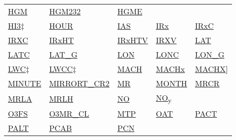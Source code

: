 \documentclass[
  english,
]{book}
\begin{document}
\begin{longtable}[]{@{}lllll@{}}
\href{./the-state-of-the-aircraft.html\#hgm}{HGM} &
\href{./the-state-of-the-aircraft.html\#hgm-232}{HGM232} &
\href{./the-state-of-the-aircraft.html\#hgme-159}{HGME} \\
\href{./the-state-of-the-aircraft.html\#hi3}{HI3\(\ddagger\)} &
\href{./general-information-about-data-files.html\#hms}{HOUR} &
\href{./obsolete-variables.html\#ias}{IAS} &
\href{./obsolete-variables.html\#irx}{IRx} &
\href{./radiation-variables.html\#irxc}{IRxC} \\
\href{./radiation-variables.html\#irxc}{IRXC} &
\href{./radiation-variables.html\#irxht}{IRxHT} &
\href{./radiation-variables.html\#irxht}{IRxHTV} &
\href{./radiation-variables.html\#irxv}{IRXV} &
\href{./the-state-of-the-aircraft.html\#latitude}{LAT} \\
\href{./the-state-of-the-aircraft.html\#latc-lonc}{LATC} &
\href{./the-state-of-the-aircraft.html\#gglat}{LAT\_G} &
\href{./the-state-of-the-aircraft.html\#longitude}{LON} &
\href{./the-state-of-the-aircraft.html\#latc-lonc}{LONC} &
\href{./the-state-of-the-aircraft.html\#gglon}{LON\_G} \\
\href{./obsolete-variables.html\#jwlwc}{LWC\(\ddagger\)} &
\href{./obsolete-variables.html\#jwlw-corrected}{LWCC\(\ddagger\)} &
\href{./the-state-of-the-atmosphere.html\#mach-number}{MACH} &
\href{./the-state-of-the-atmosphere.html\#mach-number}{MACHx} &
\href{./the-state-of-the-atmosphere.html\#mach-number}{MACHX}{]} \\
\href{./general-information-about-data-files.html\#hms}{MINUTE} &
\href{./the-state-of-the-atmosphere.html\#mirror-cr2}{MIRRORT\_CR2} &
\href{./the-state-of-the-atmosphere.html\#MR}{MR} &
\href{./general-information-about-data-files.html\#mdy}{MONTH} &
\href{./the-state-of-the-atmosphere.html\#MR}{MRCR} \\
\href{./the-state-of-the-atmosphere.html\#MR}{MRLA} &
\href{./the-state-of-the-atmosphere.html\#MR}{MRLH} &
\href{./air-chemistry-measurements.html\#no-noy}{NO} &
\href{./air-chemistry-measurements.html\#no-noy}{NO\textsubscript{y}}
& \\
\href{./obsolete-variables.html\#o3fs}{O3FS} &
\href{./air-chemistry-measurements.html\#f03-acd}{O3MR\_CL} &
\href{./the-state-of-the-atmosphere.html\#special-use-remote}{MTP} &
\href{./the-state-of-the-atmosphere.html\#oat}{OAT} &
\href{./obsolete-variables.html\#AACT}{PACT} \\
\href{./the-state-of-the-aircraft.html\#palt}{PALT} &
\href{./the-state-of-the-atmosphere.html\#p-special}{PCAB} &
\href{./aerosol-particle-measurements.html\#pcn}{PCN} &

\end{longtable}
\end{document}

